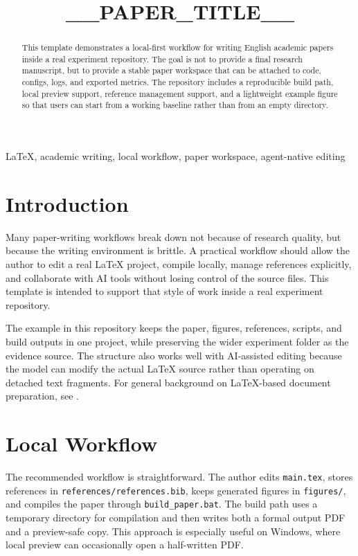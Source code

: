 \documentclass[conference]{IEEEtran}
\title{__PAPER_TITLE__}
\author{
\IEEEauthorblockN{__AUTHOR_NAME__}
\IEEEauthorblockA{
__AFFILIATION__\\
__EMAIL__
}
}
\begin{document}
\maketitle

\begin{abstract}
This template demonstrates a local-first workflow for writing English academic papers inside a real experiment repository. The goal is not to provide a final research manuscript, but to provide a stable paper workspace that can be attached to code, configs, logs, and exported metrics. The repository includes a reproducible build path, local preview support, reference management support, and a lightweight example figure so that users can start from a working baseline rather than from an empty directory.
\end{abstract}

\begin{IEEEkeywords}
LaTeX, academic writing, local workflow, paper workspace, agent-native editing
\end{IEEEkeywords}

\section{Introduction}
Many paper-writing workflows break down not because of research quality, but because the writing environment is brittle. A practical workflow should allow the author to edit a real LaTeX project, compile locally, manage references explicitly, and collaborate with AI tools without losing control of the source files. This template is intended to support that style of work inside a real experiment repository.

The example in this repository keeps the paper, figures, references, scripts, and build outputs in one project, while preserving the wider experiment folder as the evidence source. The structure also works well with AI-assisted editing because the model can modify the actual LaTeX source rather than operating on detached text fragments. For general background on LaTeX-based document preparation, see \cite{lamport1994latex}.

\section{Local Workflow}
The recommended workflow is straightforward. The author edits \texttt{main.tex}, stores references in \texttt{references/references.bib}, keeps generated figures in \texttt{figures/}, and compiles the paper through \texttt{build\_paper.bat}. The build path uses a temporary directory for compilation and then writes both a formal output PDF and a preview-safe copy. This approach is especially useful on Windows, where local preview can occasionally open a half-written PDF.
\end{document}
